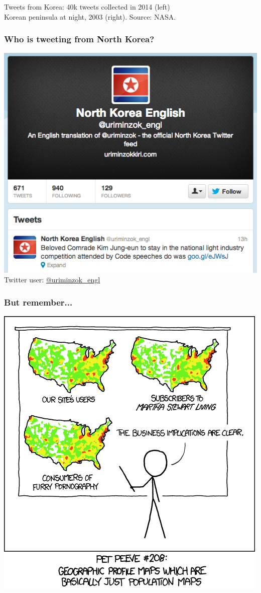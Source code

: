 \documentclass{beamer}
\begin{document}
\begin{frame}
\begin{columns}
	\end{columns}
	
	\begin{center}
		Tweets from Korea: 40k tweets collected in 2014 (left)\\
		Korean peninsula at night, 2003 (right). Source: NASA.
	\end{center}
	
	
\end{frame}

\begin{frame}[fragile]
	\frametitle{Who is tweeting from North Korea?}
	\begin{center}\includegraphics[width=.8\textheight]{figures/north_korea_tweet.png}\\
		Twitter user: \href{https://twitter.com/uriminzok_engl}{@uriminzok\_engl}\end{center}
\end{frame}


\begin{frame}[fragile]
	\frametitle{But remember...}
	\begin{center}\includegraphics[width=.60\textwidth]{figures/cartoon.png}\end{center}
\end{frame}
\end{document}
